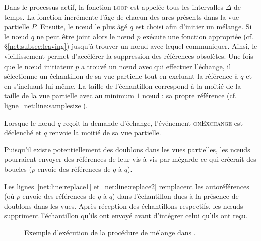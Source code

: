 Dans le processus actif, la fonction \textsc{loop} est appelée tous les
intervalles $\Delta$ de temps. La fonction incrémente l'âge de chacun des arcs
présents dans la vue partielle $P$. Ensuite, le nœud le plus âgé $q$ est choisi
afin d'initier un mélange. Si le nœud $q$ ne peut être joint alors le nœud $p$
exécute une fonction appropriée (cf.  §\ref{net:subsec:leaving}) jusqu'à trouver
un nœud avec lequel communiquer. Ainsi, le \og vieillissement \fg permet
d'accélérer la suppression des références obsolètes. Une fois que le nœud
initiateur $p$ a trouvé un nœud avec qui effectuer l'échange, il sélectionne un
échantillon de sa vue partielle tout en excluant la référence à $q$ et en
s'incluant lui-même. La taille de l'échantillon correspond à la moitié de la
taille de la vue partielle avec au minimum $1$ nœud : sa propre référence
(cf. ligne~\ref{net:line:samplesize}).


Lorsque le nœud $q$ reçoit la demande d'échange, l'événement \textsc{onExchange}
est déclenché et $q$ renvoie la moitié de sa vue partielle. 

Puisqu'il existe potentiellement des doublons dans les vues partielles, les
nœuds pourraient envoyer des références de leur vis-à-vis par mégarde ce qui
créerait des boucles ($p$ envoie des références de $q$ à $q$).  

Les lignes~\ref{net:line:replace1} et~\ref{net:line:replace2} remplacent les
autoréférences (où $p$ envoie des références de $q$ à $q$) dans l'échantillon
dues à la présence de doublons dans les vues.  Après réception des échantillons
respectifs, les nœuds suppriment l'échantillon qu'ils ont envoyé avant
d'intégrer celui qu'ils ont reçu.

\begin{figure*}
  \centering
  \hspace{40pt}
  \hspace{10pt}
  \caption[Procédure de mélange périodique dans \SPRAY]
  {\label{net:fig:cyclicexample}Exemple d'exécution de la procédure de mélange dans \SPRAY.}
\end{figure*}

